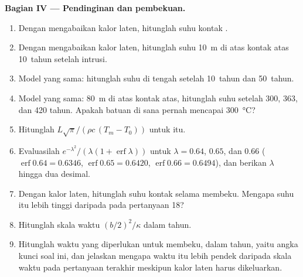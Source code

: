 \begin{problem}
\noindent\textbf{Bagian IV --- Pendinginan dan pembekuan.}
\begin{enumerate}[resume]
\item Dengan mengabaikan kalor laten, hitunglah suhu kontak .
\item Dengan mengabaikan kalor laten, hitunglah suhu \qty{10}{m} di atas kontak
atas \num{10}~tahun setelah intrusi.
\item Model yang sama: hitunglah suhu di tengah  setelah
\num{10}~tahun dan \num{50}~tahun.
\item Model yang sama: \qty{80}{m} di atas kontak atas, hitunglah suhu setelah
\num{300}, \num{363}, dan \num{420} tahun. Apakah batuan di sana pernah mencapai
\qty{300}{\celsius}?
\item Hitunglah $L\sqrt\pi/(\rho c\,(T_m - T_0))$ untuk  itu.
\item Evaluasilah $e^{-\lambda^2}/(\lambda(1 + \operatorname{erf}\lambda))$ untuk $\lambda = 0.64$,
$0.65$, dan $0.66$ ($\operatorname{erf}0.64 = 0.6346$, $\operatorname{erf}0.65 = 0.6420$,
$\operatorname{erf}0.66 = 0.6494$), dan berikan $\lambda$ hingga dua desimal.
\item Dengan kalor laten, hitunglah suhu kontak selama 
membeku. Mengapa suhu itu lebih tinggi daripada pada pertanyaan 18?
\item Hitunglah skala waktu $(b/2)^2/\kappa$ dalam tahun.
\item Hitunglah waktu yang diperlukan  untuk membeku, dalam tahun, yaitu angka kunci
soal ini, dan jelaskan mengapa waktu itu lebih pendek daripada skala waktu pada pertanyaan
terakhir meskipun kalor laten harus dikeluarkan.
\end{enumerate}
\end{problem}
